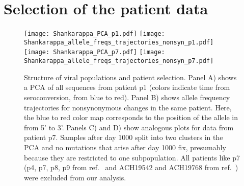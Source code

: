 

\makeatletter 
\renewcommand{\thefigure}{S\@arabic\c@figure}
\makeatother

\section{Selection of the patient data}
\begin{figure}[!ht]
\begin{center}
\texttt{[image: Shankarappa\_PCA\_p1.pdf]}
\texttt{[image: Shankarappa\_allele\_freqs\_trajectories\_nonsyn\_p1.pdf]}
\texttt{[image: Shankarappa\_PCA\_p7.pdf]}
\texttt{[image: Shankarappa\_allele\_freqs\_trajectories\_nonsyn\_p7.pdf]}
\caption{Structure of viral populations and patient selection.
Panel A) shows a PCA of all sequences from patient p1 (colors indicate time from
seroconversion, from blue to red). Panel B) shows allele frequency trajectories for nonsynonymous
changes in the same patient. Here, the blue to red color map corresponds to the
position of the allele in \env{} from 5' to 3'. Panels C) and D) show analogous
plots for data from patient p7. Samples after day 1000 split into two clusters in the PCA and no mutations that arise after day 1000 fix, presumably because they are restricted
to one subpopulation. All patients like p7 (p4, p7, p8, p9 from ref.~\citealp{shankarappa_consistent_1999} and
ACH19542 and ACH19768 from ref.~\citealp{bunnik_autologous_2008}) were excluded
from our analysis.}
\label{fig:aftp}
\end{center}
\end{figure}

\newpage
